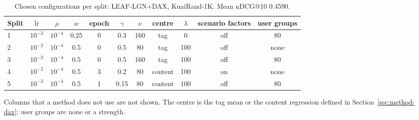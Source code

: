 \documentclass[preprint,12pt,authoryear]{elsarticle}
\begin{document}
\begin{table}[tbp]
\centering
\footnotesize
\caption{Chosen configurations per split: LEAF-LGN+DAX, KuaiRand-1K. Mean nDCG@10 0.4590.}
\label{tab:grid12}
\begin{adjustbox}{max width=\linewidth}
\begin{tabular}{lcccccccccc}
\toprule
Split & $\mathrm{lr}$ & $\rho$ & $w$ & epoch & $\gamma$ & $\nu$ & centre & $\lambda$ & scenario factors & user groups \\
\midrule
1 & $10^{-2}$ & $10^{-4}$ & 0.25 & 0 & 0.3 & 160 & tag & 0 & off & 80 \\
2 & $10^{-2}$ & $10^{-4}$ & 0.5 & 0 & 0.5 & 80 & tag & 100 & off & none \\
3 & $10^{-2}$ & $10^{-4}$ & 0.5 & 0 & 0.5 & 160 & tag & 100 & off & 80 \\
4 & $10^{-2}$ & $10^{-4}$ & 0.5 & 3 & 0.2 & 80 & content & 100 & on & none \\
5 & $10^{-2}$ & $10^{-4}$ & 0.5 & 1 & 0.15 & 80 & content & 100 & off & 80 \\
\bottomrule
\end{tabular}
\end{adjustbox}
\par\smallskip
\begin{minipage}{\linewidth}\raggedright\footnotesize Columns that a method does not use are not shown. The centre is the tag mean or the content regression defined in Section~\ref{sec:method-dax}; user groups are none or a strength.\end{minipage}
\end{table}
\end{document}
